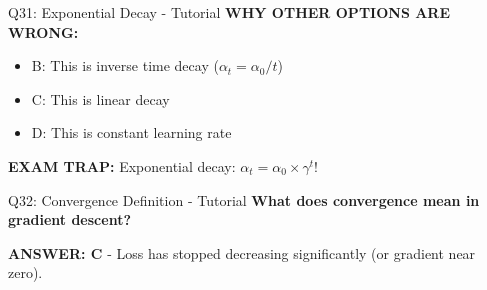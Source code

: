 \documentclass[8pt]{beamer}
\begin{document}
\begin{frame}{Q31: Exponential Decay - Tutorial}
		\vspace{0.05cm}
		\textcolor{myred}{\textbf{WHY OTHER OPTIONS ARE WRONG:}}
		\begin{itemize}
			\item \textcolor{myred}{B:} This is inverse time decay ($\alpha_t = \alpha_0 / t$)
			\item \textcolor{myred}{C:} This is linear decay
			\item \textcolor{myred}{D:} This is constant learning rate
		\end{itemize}
		
		\textcolor{myred}{\textbf{EXAM TRAP:}} Exponential decay: $\alpha_t = \alpha_0 \times \gamma^{t}$!
	\end{frame}
	
	\begin{frame}{Q32: Convergence Definition - Tutorial}
		\fontsize{6.5}{7.5}\selectfont
		\textbf{What does convergence mean in gradient descent?}
		
		\vspace{0.05cm}
		\textcolor{myblue}{\textbf{ANSWER: C}} - Loss has stopped decreasing significantly (or gradient near zero).
		

\end{frame}
\end{document}
